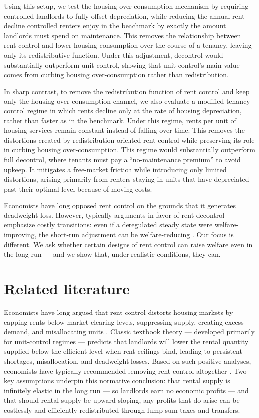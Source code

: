 \documentclass[parskip=full]{article}
\begin{document}
Using this setup, we test the housing over-consumption mechanism by requiring controlled landlords to fully offset depreciation, while reducing the annual rent decline controlled renters enjoy in the benchmark by exactly the amount landlords must spend on maintenance. This removes the relationship between rent control and lower housing consumption over the course of a tenancy, leaving only its redistributive function. Under this adjustment, decontrol would substantially outperform unit control, showing that unit control’s main value comes from curbing housing over-consumption rather than redistribution.

In sharp contrast, to remove the redistribution function of rent control and keep only the housing over-consumption channel, we also evaluate a modified tenancy-control regime in which rents decline only at the rate of housing depreciation, rather than faster as in the benchmark. Under this regime, rents per unit of housing services remain constant instead of falling over time. This removes the distortions created by redistribution-oriented rent control while preserving its role in curbing housing over-consumption. This regime would substantially outperform full decontrol, where tenants must pay a “no-maintenance premium” to avoid upkeep. It mitigates a free-market friction while introducing only limited distortions, arising primarily from renters staying in units that have depreciated past their optimal level because of moving costs.

Economists have long opposed rent control on the grounds that it generates deadweight loss. However, typically arguments in favor of rent decontrol emphasize costly transitions: even if a deregulated steady state were welfare-improving, the short-run adjustment can be welfare-reducing \citep{fmn-2023}. Our focus is different. We ask whether certain designs of rent control can raise welfare even in the long run — and we show that, under realistic conditions, they can.

\section{Related literature}\label{sec:related_lit}

Economists have long argued that rent control distorts housing markets by capping rents below market-clearing levels, suppressing supply, creating excess demand, and misallocating units \citep{suen-1989,gl-2003,diamond-2019}. Classic textbook theory — developed primarily for unit-control regimes — predicts that landlords will lower the rental quantity supplied below the efficient level when rent ceilings bind, leading to persistent shortages, misallocation, and deadweight losses. Based on such positive analyses, economists have typically recommended removing rent control altogether \citep{lindbeck1971,buchanan_1986,friedman_stigler_1946}. Two key assumptions underpin this normative conclusion: that rental supply is infinitely elastic in the long run — so landlords earn no economic profits — and that should rental supply be upward sloping, any profits that do arise can be costlessly and efficiently redistributed through lump-sum taxes and transfers.
\end{document}
